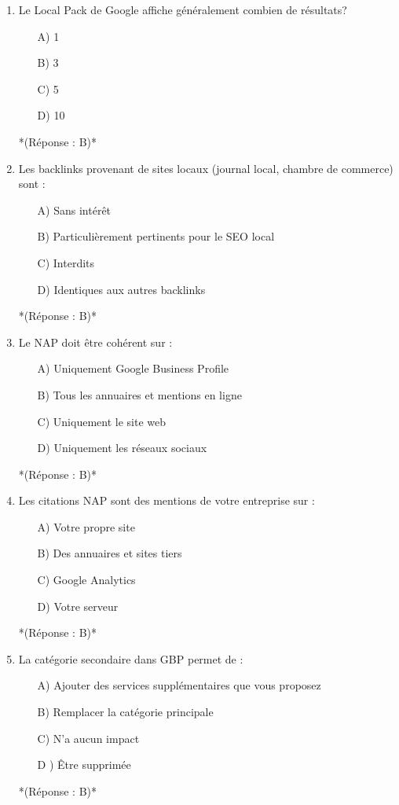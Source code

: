 \documentclass[12pt,a4paper,twoside]{report}
\begin{document}
\begin{enumerate}
\item Le Local Pack de Google affiche généralement combien de résultats?
\begin{itemize}
\item[A)] 1
\item[B)] 3
\item[C)] 5
\item[D)] 10
\end{itemize}
*(Réponse : B)*

\item Les backlinks provenant de sites locaux (journal local, chambre de commerce) sont :
\begin{itemize}
\item[A)] Sans intérêt
\item[B)] Particulièrement pertinents pour le SEO local
\item[C)] Interdits
\item[D)] Identiques aux autres backlinks
\end{itemize}
*(Réponse : B)*

\item Le NAP doit être cohérent sur :
\begin{itemize}
\item[A)] Uniquement Google Business Profile
\item[B)] Tous les annuaires et mentions en ligne
\item[C)] Uniquement le site web
\item[D)] Uniquement les réseaux sociaux
\end{itemize}
*(Réponse : B)*

\item Les citations NAP sont des mentions de votre entreprise sur :
\begin{itemize}
\item[A)] Votre propre site
\item[B)] Des annuaires et sites tiers
\item[C)] Google Analytics
\item[D)] Votre serveur
\end{itemize}
*(Réponse : B)*

\item La catégorie secondaire dans GBP permet de :
\begin{itemize}
\item[A)] Ajouter des services supplémentaires que vous proposez
\item[B)] Remplacer la catégorie principale
\item[C)] N'a aucun impact
\item[D]) Être supprimée
\end{itemize}
*(Réponse : B)*


\end{enumerate}
\end{document}
